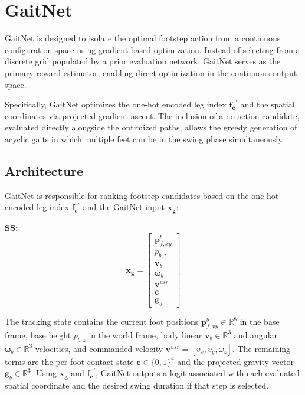 \section{GaitNet}
\label{sec:methodology-gaitnet}

GaitNet is designed to isolate the optimal footstep action from a
continuous configuration space using gradient-based optimization.
Instead of selecting from a discrete grid populated by a prior evaluation
network, GaitNet serves as the primary reward estimator, enabling direct
optimization in the continuous output space.

Specifically, GaitNet optimizes the one-hot encoded leg index
$\mathbf{f_c}^{\prime}$
and the spatial coordinates via projected gradient ascent. The inclusion of a
no-action candidate, evaluated directly alongside the optimized paths,
allows the greedy generation of acyclic gaits in which multiple feet
can be in the swing phase simultaneously.

\subsection{Architecture}
\label{subsec:methodology-gaitnet-architecture}

GaitNet is responsible for ranking footstep candidates based on the
one-hot encoded leg index $\mathbf{f_c}^{\prime}$ and the GaitNet
input $\mathbf{x_g}$:

{\color{red}
\noindent\textbf{SS:}
\begin{equation}
  \mathbf{x_g} =
  \begin{bmatrix}
    \mathbf p_{f,xy}^{b} \\
    p_{b,z} \\
    \mathbf v_b \\
    \mathbf \omega_b \\
    \mathbf v^{usr} \\
    \mathbf c \\
    \mathbf g_b
  \end{bmatrix}
  \label{eq:gaitnet-x}
\end{equation}

The tracking state contains the current foot positions
$\mathbf p_{f,xy}^{b} \in \mathbb{R}^{8}$ in the base frame,
base height $p_{b,z}$ in the world frame, body linear
$\mathbf v_b \in \mathbb{R}^{3}$ and angular
$\mathbf \omega_b \in \mathbb{R}^{3}$ velocities, and commanded
velocity $\mathbf v^{usr} = [v_x, v_y, \omega_z]$.
The remaining terms are the per-foot contact state
$\mathbf c \in \{0,1\}^{4}$ and the projected gravity vector
$\mathbf g_b \in \mathbb{R}^{3}$. Using $\mathbf{x_g}$ and
$\mathbf{f_c}^{\prime}$,
GaitNet outputs a logit associated with
each evaluated spatial coordinate and the desired swing duration if
that step is selected.
}

